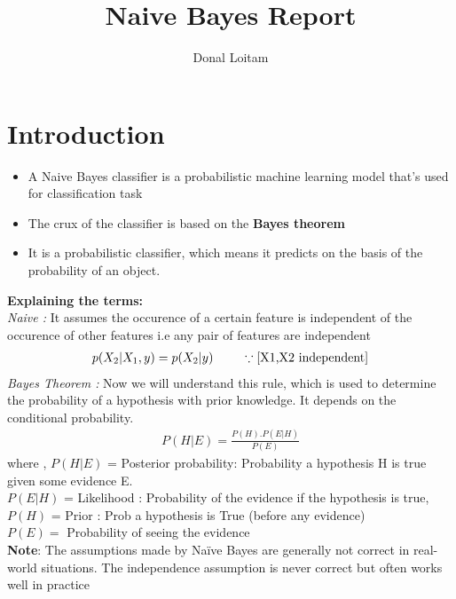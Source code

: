 \documentclass[a4paper, 11pt]{article}
\title{Naive Bayes Report}
\author{Donal Loitam}
\begin{document}
\maketitle
\tableofcontents

\section{Introduction}
\begin{itemize}
    \item A Naive Bayes classifier is a probabilistic machine learning model that’s used for classification task
    \item  The crux of the classifier is based on the \textbf{Bayes theorem}
    \item It is a probabilistic classifier, which means it predicts on the basis of the probability of an object.
\end{itemize}
\textbf{Explaining the terms:}\\
\textit{Naive : } It assumes the occurence of a certain feature is independent of the occurence of other features i.e any pair of features are independent
\begin{align}
    p(X_2|X_1,y) = p(X_2|y) \hspace{8mm} \because \text{[X1,X2 independent]}
\end{align}
\textit{Bayes Theorem :} Now we will understand this rule, which is used to determine the probability of a hypothesis with prior knowledge. It depends on the conditional probability.
\begin{align}
    P(H|E) = \frac{P(H).P(E|H)}{P(E)}
\end{align}
where , $P(H|E)$ = Posterior probability: Probability a hypothesis H is true given some evidence E.\\
$P(E|H)$ = Likelihood : Probability of the evidence if the hypothesis is true,\\
$P(H)$ = Prior : Prob a hypothesis is True (before any evidence) \\
$P(E) = $ Probability of seeing the evidence  \vspace{6mm}\\
\textbf{Note}: The assumptions made by Naïve Bayes are generally not correct in real-world situations. The independence assumption is never correct but often works well in practice
\pagebreak
\end{document}
